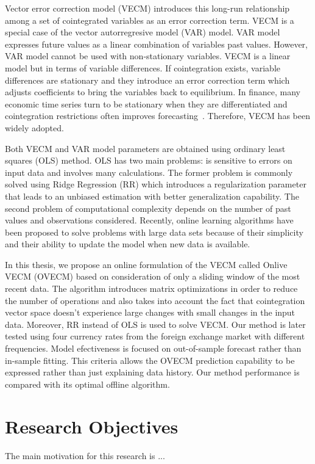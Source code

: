 Vector error correction model (VECM) introduces this long-run relationship
among a set of cointegrated variables as an error correction term. VECM is a
special case of the vector autorregresive model (VAR) model. VAR model
expresses future values as a linear combination of variables past values.
However, VAR model cannot be used with non-stationary variables. VECM is a
linear model but in terms of variable differences. If cointegration exists,
variable differences are stationary and they introduce an error correction term
which adjusts coefficients to bring the variables back to equilibrium. In
finance, many economic time series turn to be stationary when they are
differentiated and cointegration restrictions often improves
forecasting~\cite{duy1998}. Therefore, VECM has been widely adopted.

Both VECM and VAR model parameters are obtained using ordinary least squares
(OLS) method. OLS has two main problems: is sensitive to errors on input data
and involves many calculations. The former problem is commonly solved using
Ridge Regression (RR) \cite{hoerl1970} which introduces a regularization
parameter that leads to an unbiased estimation with better generalization
capability. The second problem of computational complexity depends on the number
of past values and observations considered.  Recently, online learning
algorithms have been proposed to solve problems with large data sets because of
their simplicity and their ability to update the model when new data is
available. 

In this thesis, we propose an online formulation of the VECM called Onlive VECM
(OVECM) based on consideration of only a sliding window of the most recent data.
The algorithm introduces matrix optimizations in order to reduce the number of
operations and also takes into account the fact that cointegration vector space
doesn't experience large changes with small changes in the input data. Moreover,
RR instead of OLS is used to solve VECM. Our method is later tested using four
currency rates from the foreign exchange market with different frequencies.  Model
efectiveness is focused on out-of-sample forecast rather than in-sample fitting.
This criteria allows the OVECM prediction capability to be expressed rather than
just explaining data history. Our method performance is compared with its
optimal offline algorithm.


\section{Research Objectives}
The main motivation for this research is ...

